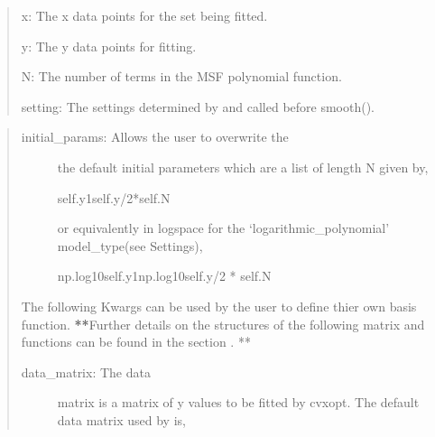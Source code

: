 \documentclass[letterpaper,10pt,english]{sphinxmanual}
\begin{document}
\begin{fulllineitems}
\label{\detokenize{source/maxsmooth:maxsmooth.msf.smooth}}
\begin{quote}

x:  The x data points for the set being fitted.

y:  The y data points for fitting.

N:  The number of terms in the MSF polynomial function.

setting:  The settings determined by
 and called before smooth().
\end{quote}

\begin{quote}
\begin{description}
\item[{initial\_params:  Allows the user to overwrite the}] \leavevmode
the default initial parameters which are a list of length N given
by,

\begin{sphinxVerbatim}[commandchars=\\\{\}]
  \PYG{o}{[}self.y\PYG{o}{[}\PYGZhy{}1\PYG{o}{]}\PYGZhy{}self.y\PYG{o}{[}\PYG{o}{]}/2\PYG{o}{]}*self.N
\end{sphinxVerbatim}

or equivalently in log\sphinxhyphen{}space for the ‘logarithmic\_polynomial’
model\_type(see Settings),

\begin{sphinxVerbatim}[commandchars=\\\{\}]
  \PYG{o}{[}np.log10self.y\PYG{o}{[}\PYGZhy{}1\PYG{o}{]}\PYGZhy{}np.log10self.y\PYG{o}{[}\PYG{o}{]}/2\PYG{o}{]} *
    self.N
\end{sphinxVerbatim}

\end{description}

The following Kwargs can be used by the user to define thier own basis
function. {\color{red}\bfseries{}**}Further details on the structures of the following matrix
and functions can be found in the section .
**
\begin{description}
\item[{data\_matrix:  The data}] \leavevmode
matrix is a matrix of y values to be fitted by cvxopt.
The default data matrix used by  is,


\end{description}
\end{quote}
\end{fulllineitems}
\end{document}
